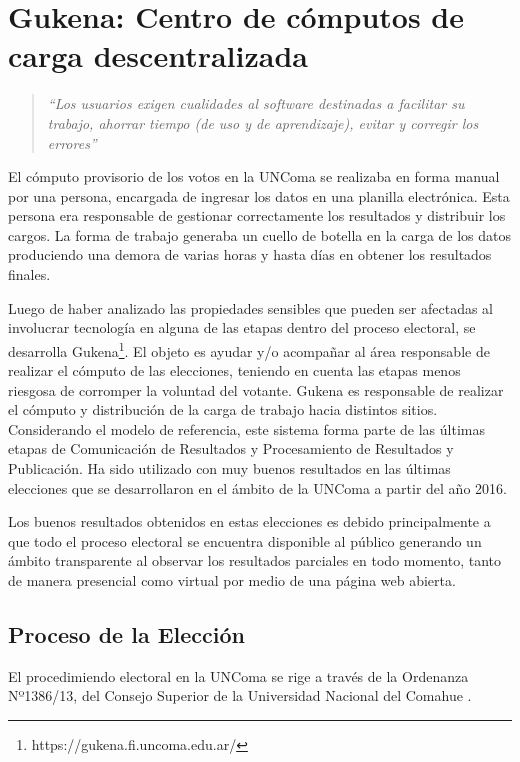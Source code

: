 \chapter[Gukena]{Gukena: Centro de cómputos de carga descentralizada}
\label{Gukena}

\begin{quote}\textit{``Los usuarios exigen cualidades al software destinadas a facilitar su trabajo, ahorrar tiempo (de uso y de aprendizaje), evitar y corregir los errores''} \citep{definicionUsuarioInterfaz}\end{quote} 
El cómputo provisorio de los votos en la UNComa se realizaba en forma manual por una persona, encargada de ingresar los datos en una planilla electrónica. Esta persona era responsable de gestionar correctamente los resultados y distribuir los cargos. La forma de trabajo generaba un cuello de botella en la carga de los datos produciendo una demora de varias horas y hasta días en obtener los resultados finales.

Luego de haber analizado las propiedades sensibles que pueden ser afectadas al involucrar tecnología en alguna de las etapas dentro del proceso electoral, se desarrolla Gukena\footnote{https://gukena.fi.uncoma.edu.ar/}. El objeto es ayudar y/o 
acompañar al área responsable de realizar el cómputo de las elecciones, teniendo en cuenta las etapas menos riesgosa de corromper la voluntad del votante. Gukena es responsable de realizar el cómputo y distribución de la carga de trabajo hacia distintos sitios. Considerando el modelo de referencia, este sistema forma parte de las últimas etapas de Comunicación de Resultados y Procesamiento de Resultados y Publicación. Ha sido utilizado con muy buenos resultados en las últimas elecciones que se desarrollaron en el ámbito de la UNComa a partir del año 2016. 

Los buenos resultados obtenidos en estas elecciones es debido principalmente a que todo el proceso electoral se encuentra disponible al público generando un ámbito transparente al observar los resultados parciales en todo momento, tanto de manera presencial como virtual por medio de una página web abierta.


\section{Proceso de la Elección}

El procedimiendo electoral en la UNComa se rige a través de la Ordenanza Nº1386/13, del Consejo Superior de la Universidad Nacional del Comahue \cite{ordenanzaUncoma}.

